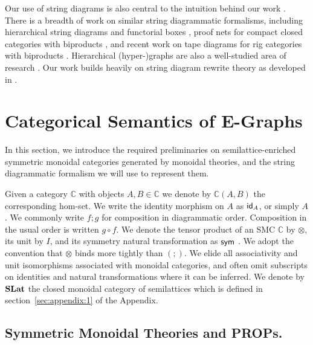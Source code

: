 Our use of string diagrams is also central to the intuition behind our work \cite{Selinger_2010, joyal_geometry_1991}.  
There is a breadth of work on similar string diagrammatic formalisms,  including hierarchical string diagrams \cite{ghica-zanassi2023string} and functorial boxes \cite{mellies_functorial_2006},  proof nets for compact closed categories with biproducts \cite{duncan_generalised_2009}, and recent work on tape diagrams for rig categories with biproducts \cite{bonchi_tape_nodate}. 
Hierarchical (hyper-)graphs are also a well-studied area of research \cite{plump:hierarchical-graphs, montanari:gs-lambda, palacz:hierarchical-transform, Gaducci:hierarchical-graphs, Ghica:hierarchical}. 
Our work builds heavily on string diagram rewrite theory as developed in \cite{bonchi_string_2022,bonchi_string_2022-1, bonchi_string_2022-2}. 

\section{Categorical Semantics of E-Graphs}
In this section,  we introduce the required preliminaries on semilattice-enriched symmetric monoidal categories generated by monoidal theories,  and the string diagrammatic formalism we will use to represent them.  

Given a category $\mathbb{C}$  with objects $A,B \in \mathbb{C}$ we denote by $\mathbb{C}(A,B)$ the corresponding hom-set.  
We write the identity morphism on $A$ as $\textsf{id}_A$,  or simply $A$.  
We commonly write $f;g$ for composition in diagrammatic order.  
Composition in the usual order is written $g \circ f$.  
We denote the tensor product of an SMC $\mathbb{C}$ by $\otimes$,  its unit by $I$, and its symmetry natural transformation as $\textsf{sym}$ \cite{maclane}.  
We adopt the convention that $\otimes$ binds more tightly than $(;\!)$.  
We elide all associativity and unit isomorphisms associated with monoidal categories,  and often omit subscripts on identities and natural transformations where it can be inferred.  
We denote by $\mathbf{SLat}$ the closed monoidal category of semilattices which is defined in section~\ref{sec:appendix:1} of the Appendix.


\subsection{Symmetric Monoidal Theories and PROPs.}

